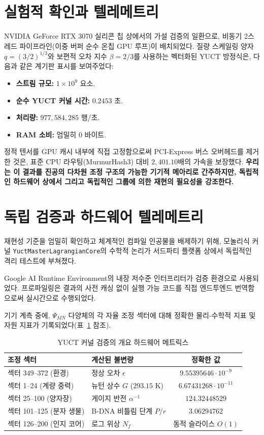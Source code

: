 \documentclass[11pt,a4paper]{article}
\begin{document}
	\section{실험적 확인과 텔레메트리}
	NVIDIA GeForce RTX 3070 실리콘 칩 상에서의 가설 검증의 일환으로, 비동기 2스레드 파이프라인(이중 버퍼 순수 온칩 GPU 루프)이 배치되었다. 질량 스케일링 양자 $q = (3/2)^{1/3}$와 보편적 오차 지수 $\beta = 2/3$를 사용하는 벡터화된 YUCT 방정식은, 다음과 같은 계기판 표시를 보여주었다:
	\begin{itemize}
		\item \textbf{스트림 규모:} $1 \times 10^9$ 요소.
		\item \textbf{순수 YUCT 커널 시간:} $0.2453$ 초.
		\item \textbf{처리량:} $977,584,285$ 행/초.
		\item \textbf{RAM 소비:} 엄밀히 $0$ 바이트.
	\end{itemize}
	
	정적 텐서를 GPU 캐시 내부에 직접 고정함으로써 PCI-Express 버스 오버헤드를 제거한 것은, 표준 CPU 라우팅(MurmurHash3) 대비 $2,401.10$배의 가속을 보장했다. \textbf{우리는 이 결과를 진공의 다차원 조정 구조의 가능한 기기적 메아리로 간주하지만, 독립적인 하드웨어 상에서 그리고 독립적인 그룹에 의한 재현의 필요성을 강조한다.}
	
	\section{독립 검증과 하드웨어 텔레메트리}
	재현성 기준을 엄밀히 확인하고 체계적인 컴파일 인공물을 배제하기 위해, 모놀리식 커널 \texttt{YuctMasterLagrangianCore}의 수학적 논리가 서드파티 플랫폼 상에서 독립적인 격리 테스트에 부쳐졌다.
	
	Google AI Runtime Environment의 내장 저수준 인터프리터가 검증 환경으로 사용되었다. 프로파일링은 결과의 사전 캐싱 없이 실행 가능 코드를 직접 엔드투엔드 번역함으로써 실시간으로 수행되었다.
	
	기기 계측 중에, $\Psi_{MN}$ 다양체의 각 자율 조정 섹터에 대해 정확한 물리-수학적 지표 및 자원 지표가 기록되었다(표~\ref{tab:telemetry_metrics} 참조).
	
	\begin{table}[h!]
		\centering
		\caption{YUCT 커널 검증의 개요 하드웨어 메트릭스}
		\label{tab:telemetry_metrics}
		\small
		\begin{tabular}{llc}
			\toprule
			\textbf{조정 섹터} & \textbf{계산된 불변량} & \textbf{정확한 값} \\
			\midrule
			섹터 349–372 (환경) & 정상 오차 $\epsilon$ & $9.55395646 \cdot 10^{-9}$ \\
			섹터 1–24 (계량 중력) & 뉴턴 상수 $G$ ($293.15$ K) & $6.67431268 \cdot 10^{-11}$ \\
			섹터 25–100 (양자장) & 게이지 반전 $\alpha^{-1}$ & $124.32448529$ \\
			섹터 101–125 (분자 생물) & B-DNA 비틀림 단계 $P/r$ & $3.06294762$ \\
			섹터 126–200 (인지 코어) & 로그 위상 $N_f$ & 동적 슬라이스 $O(1)$ \\
			\bottomrule
		\end{tabular}
	\end{table}
	
\end{document}
